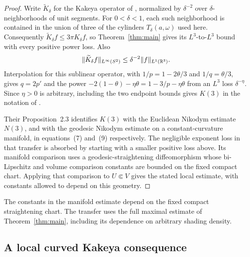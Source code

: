 \begin{proof}
Write \(\widetilde K_\delta\) for the Kakeya operator of
\citet[Section~2.2]{GLX2025}, normalized by \(\delta^{-2}\) over
\(\delta\)-neighborhoods of unit segments. For \(0<\delta<1\), each
such neighborhood is contained in the union of three of the cylinders
\(T_\delta(a,\omega)\) used here. Consequently
\(\widetilde K_\delta f\le3\pi K_\delta f\), so
Theorem~\ref{thm:main} gives its \(L^3\)-to-\(L^3\) bound with every
positive power loss. Also
\[
\|\widetilde K_\delta f\|_{L^\infty(S^2)}
\le\delta^{-2}\|f\|_{L^1(\mathbb R^3)}.
\]
Interpolation for this sublinear operator, with
\(1/p=1-2\theta/3\) and \(1/q=\theta/3\), gives \(q=2p'\) and the
power \(-2(1-\theta)-\eta\theta=1-3/p-\eta\theta\) from an
\(L^3\) loss \(\delta^{-\eta}\). Since \(\eta>0\) is arbitrary,
including the two endpoint bounds gives \(K(3)\) in the notation of
\citet[equation~(6)]{GLX2025}.

Their Proposition~2.3 identifies \(K(3)\) with the Euclidean Nikodym
estimate \(N(3)\), and with the geodesic Nikodym estimate on a
constant-curvature manifold, in equations~(7) and~(9) respectively.
The negligible exponent loss in that transfer is absorbed by starting
with a smaller positive loss above. Its manifold comparison uses a
geodesic-straightening diffeomorphism whose bi-Lipschitz and volume
comparison constants are bounded on the fixed compact chart. Applying
that comparison to \(U\Subset V\) gives the stated local estimate,
with constants allowed to depend on this geometry.
\end{proof}

The constants in the manifold estimate depend on the fixed compact
straightening chart. The transfer uses the full maximal estimate of
Theorem~\ref{thm:main}, including its dependence on arbitrary shading
density.

\subsection{A local curved Kakeya consequence}

